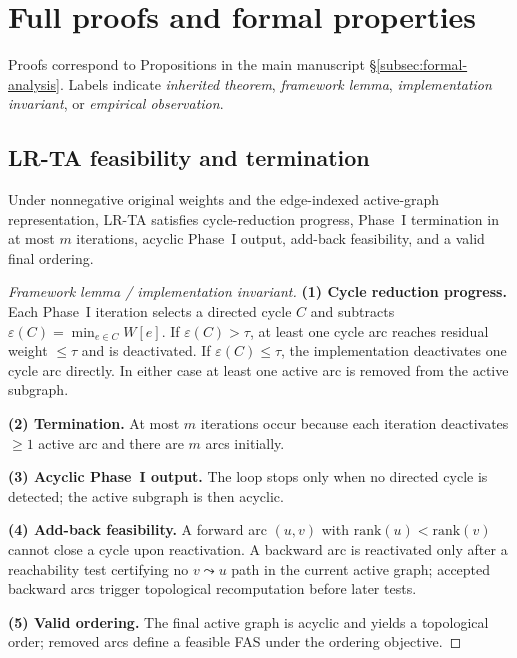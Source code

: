 \section{Full proofs and formal properties}
\label{sec:or1-proofs}

Proofs correspond to Propositions in the main manuscript \S\ref{subsec:formal-analysis}. Labels indicate \emph{inherited theorem}, \emph{framework lemma}, \emph{implementation invariant}, or \emph{empirical observation}.

\subsection{LR-TA feasibility and termination}

\begin{proposition}
Under nonnegative original weights and the edge-indexed active-graph representation, LR-TA satisfies cycle-reduction progress, Phase~I termination in at most $m$ iterations, acyclic Phase~I output, add-back feasibility, and a valid final ordering.
\end{proposition}

\begin{proof}[Framework lemma / implementation invariant]
\textbf{(1) Cycle reduction progress.} Each Phase~I iteration selects a directed cycle $C$ and subtracts $\varepsilon(C)=\min_{e\in C}W[e]$. If $\varepsilon(C)>\tau$, at least one cycle arc reaches residual weight $\le\tau$ and is deactivated. If $\varepsilon(C)\le\tau$, the implementation deactivates one cycle arc directly. In either case at least one active arc is removed from the active subgraph.

\textbf{(2) Termination.} At most $m$ iterations occur because each iteration deactivates $\ge 1$ active arc and there are $m$ arcs initially.

\textbf{(3) Acyclic Phase~I output.} The loop stops only when no directed cycle is detected; the active subgraph is then acyclic.

\textbf{(4) Add-back feasibility.} A forward arc $(u,v)$ with $\mathrm{rank}(u)<\mathrm{rank}(v)$ cannot close a cycle upon reactivation. A backward arc is reactivated only after a reachability test certifying no $v\leadsto u$ path in the current active graph; accepted backward arcs trigger topological recomputation before later tests.

\textbf{(5) Valid ordering.} The final active graph is acyclic and yields a topological order; removed arcs define a feasible FAS under the ordering objective.
\end{proof}


